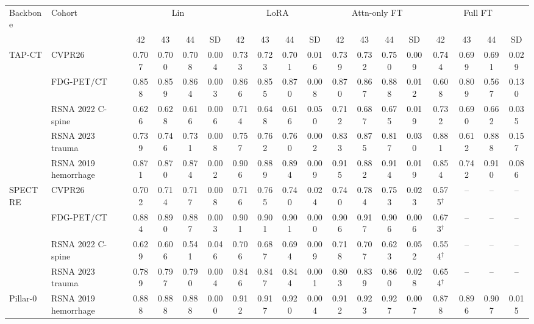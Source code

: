 \setlength{\tabcolsep}{3.5pt}
\begin{tabular}{@{}llcccccccccccccccc@{}}
\toprule
Backbone & Cohort & \multicolumn{4}{c}{Lin} & \multicolumn{4}{c}{LoRA} & \multicolumn{4}{c}{Attn-only FT} & \multicolumn{4}{c}{Full FT} \\
\cmidrule(lr){3-6}\cmidrule(lr){7-10}\cmidrule(lr){11-14}\cmidrule(lr){15-18}
 & & 42 & 43 & 44 & SD & 42 & 43 & 44 & SD & 42 & 43 & 44 & SD & 42 & 43 & 44 & SD \\
\midrule
TAP-CT & CVPR26 & 0.707 & 0.700 & 0.708 & 0.004 & 0.733 & 0.723 & 0.701 & 0.016 & 0.739 & 0.732 & 0.750 & 0.009 & 0.744 & 0.699 & 0.691 & 0.029 \\
 & FDG-PET/CT & 0.858 & 0.859 & 0.864 & 0.003 & 0.866 & 0.855 & 0.870 & 0.008 & 0.870 & 0.867 & 0.888 & 0.012 & 0.608 & 0.809 & 0.567 & 0.130 \\
 & RSNA 2022 C-spine & 0.626 & 0.628 & 0.616 & 0.006 & 0.714 & 0.648 & 0.616 & 0.050 & 0.712 & 0.687 & 0.675 & 0.019 & 0.732 & 0.690 & 0.662 & 0.035 \\
 & RSNA 2023 trauma & 0.739 & 0.746 & 0.731 & 0.008 & 0.757 & 0.762 & 0.760 & 0.002 & 0.833 & 0.875 & 0.817 & 0.030 & 0.881 & 0.612 & 0.888 & 0.157 \\
 & RSNA 2019 hemorrhage & 0.871 & 0.870 & 0.874 & 0.002 & 0.906 & 0.889 & 0.894 & 0.009 & 0.915 & 0.882 & 0.914 & 0.019 & 0.854 & 0.742 & 0.910 & 0.086 \\
\addlinespace
SPECTRE & CVPR26 & 0.702 & 0.714 & 0.717 & 0.008 & 0.716 & 0.765 & 0.740 & 0.024 & 0.740 & 0.784 & 0.753 & 0.023 & 0.575$^{\dagger}$ & -- & -- & -- \\
 & FDG-PET/CT & 0.884 & 0.890 & 0.887 & 0.003 & 0.901 & 0.901 & 0.901 & 0.000 & 0.906 & 0.917 & 0.906 & 0.006 & 0.673$^{\dagger}$ & -- & -- & -- \\
 & RSNA 2022 C-spine & 0.629 & 0.606 & 0.541 & 0.046 & 0.706 & 0.687 & 0.694 & 0.009 & 0.718 & 0.707 & 0.623 & 0.052 & 0.554$^{\dagger}$ & -- & -- & -- \\
 & RSNA 2023 trauma & 0.789 & 0.797 & 0.790 & 0.004 & 0.846 & 0.847 & 0.844 & 0.001 & 0.803 & 0.839 & 0.860 & 0.028 & 0.654$^{\dagger}$ & -- & -- & -- \\
\addlinespace
Pillar-0 & RSNA 2019 hemorrhage & 0.888 & 0.888 & 0.888 & 0.000 & 0.912 & 0.917 & 0.920 & 0.004 & 0.912 & 0.923 & 0.927 & 0.007 & 0.878 & 0.896 & 0.907 & 0.015 \\
\bottomrule
\end{tabular}
